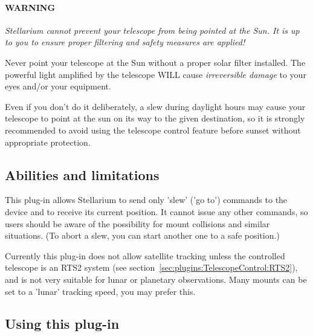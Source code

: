 \paragraph{WARNING}\emph{Stellarium cannot prevent your
telescope from being pointed at the Sun. It is up to you to ensure
proper filtering and safety measures are applied!}

Never point your telescope at the Sun without a proper solar filter
installed. The powerful light amplified by the telescope WILL cause
\emph{irreversible damage} to your eyes and/or your equipment.

Even if you don't do it deliberately, a slew during daylight hours may
cause your telescope to point at the sun on its way to the given
destination, so it is strongly recommended to avoid using the
telescope control feature before sunset without appropriate
protection.



\subsection{Abilities and limitations}
\label{sec:plugins:TelescopeControl:Limitations}

This plug-in allows Stellarium to send only 'slew' ('go to') commands
to the device and to receive its current position. It cannot issue any
other commands, so users should be aware of the possibility for mount
collisions and similar situations. (To abort a slew, you can start
another one to a safe position.)

Currently this plug-in does not allow satellite tracking unless the controlled 
telescope is an RTS2 system (see section~\ref{sec:plugins:TelescopeControl:RTS2}), 
and is not very suitable for lunar or planetary observations. 
Many mounts can be set to a 'lunar' tracking speed, you may prefer this. 

\subsection{Using this plug-in}
\label{sec:plugins:TelescopeControl:using}

